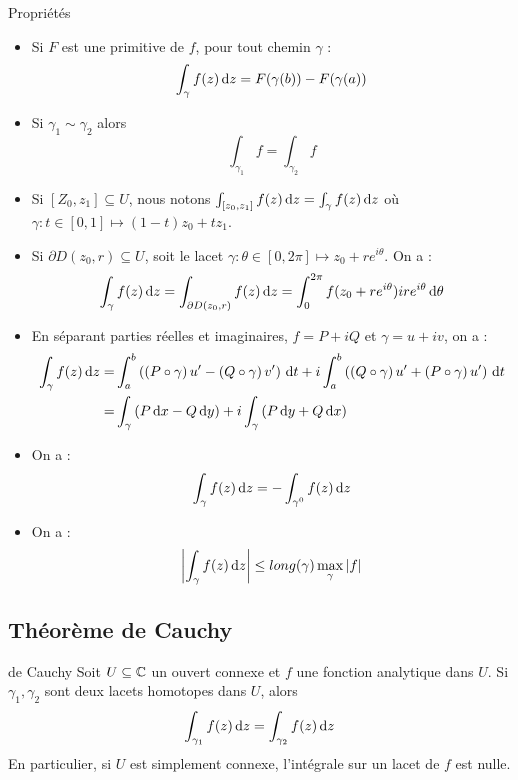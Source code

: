 \documentclass{cours}
\begin{document}
\begin{propositionfr}{Propriétés}{}
    \begin{itemize}
        \item Si $F$ est une primitive de $f$, pour tout chemin $\gamma$ : 
        \[
            \int_{\gamma}f(z){\rm \, d} z = F(\gamma(b)) - F(\gamma(a))
        \]
        \item Si $\gamma_{1} \sim \gamma_{2}$ alors 
        \[
            \int_{\gamma_{1}} f = \int_{\gamma_{2}} f
        \]
        \item Si $[Z_{0}, z_{1}] \subseteq U$, nous notons $\int_{[z_{0}, z_{1}]} f(z){\rm \, d} z = \int_{\gamma}f(z){\rm \, d} z$ où $\gamma : t\in [0, 1] \mapsto (1 - t)z_{0} + tz_{1}$.
        \item Si $\partial D(z_{0}, r) \subseteq U$, soit le lacet $\gamma : \theta \in [0, 2\pi] \mapsto z_{0} + re^{i\theta}$. On a : 
        \[
            \int_{\gamma}f(z) {\rm \, d} z = \int_{\partial D(z_{0}, r)}f(z){\rm \, d} z = \int_{0}^{2\pi}f(z_{0} + re^{i\theta})ire^{i\theta}{\rm \, d}\theta
        \]
        \item En séparant parties réelles et imaginaires, $f = P + iQ$ et $\gamma = u + iv$, on a :
        \[
            \begin{aligned}
                \int_{\gamma}f(z) {\rm \, d} z = & \int_{a}^{b}\left(\left(P \circ \gamma\right)u' - \left(Q \circ \gamma\right)v'\right){\rm \, d} t + i \int_{a}^{b}\left(\left(Q \circ \gamma\right)u' + \left(P \circ \gamma\right)u'\right){\rm \, d} t\\
                = &\int_{\gamma}\left(P{\rm \, d} x - Q{\rm \, d} y\right) + i \int_{\gamma}\left(P{\rm \, d} y + Q {\rm \, d} x\right)
            \end{aligned}
        \]
        \item On a :
        \[
            \int_{\gamma} f(z) {\rm \, d} z = - \int_{\gamma^{0}}f(z) {\rm \, d} z
        \]
        \item On a :
        \[
            \left|\int_{\gamma}f(z){\rm \, d} z\right| \leq long(\gamma)\max_{\gamma}\left|f\right|
        \] 
    \end{itemize}
\end{propositionfr}

\subsection{Théorème de Cauchy}
\begin{théorème}{de Cauchy}{}
    Soit $U \subseteq \mathbb{C}$ un ouvert connexe et $f$ une fonction analytique dans $U$. Si $\gamma_{1}, \gamma_{2}$ sont deux lacets homotopes dans $U$, alors
    \[
        \int_{\gamma_{1}}f(z) {\rm \, d} z = \int_{\gamma_{2}}f(z){\rm \, d} z
    \]
    En particulier, si $U$ est simplement connexe, l'intégrale sur un lacet de $f$ est nulle. 
\end{théorème}
\end{document}
